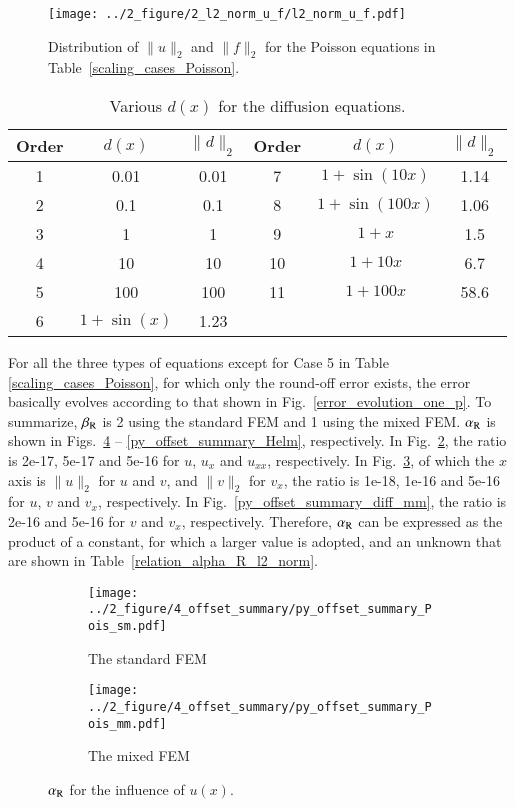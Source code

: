 \documentclass[review,3p]{elsarticle}
\begin{document}
\begin{figure}[!ht]
\centering
    \texttt{[image: ../2\_figure/2\_l2\_norm\_u\_f/l2\_norm\_u\_f.pdf]}
    \caption{Distribution of $\|u\|_2$ and $\|f\|_2$ for the Poisson equations in Table~\ref{scaling_cases_Poisson}.}
    \label{l2_norm_u_f}
\end{figure}


\begin{table}[!ht]
\centering
\caption [w]{Various $d(x)$ for the diffusion equations.} 
\label{d_diffusion_equations}
 \begin{tabular}{c c c c c c} \hline
Order &$d(x)$ & $\|d\|_2$ & Order &$d(x)$ & $\|d\|_2$ \\ \hline
1 & 0.01 & 0.01 & 7 & $1+\sin(10x)$ & 1.14 \\ \hline
2 & 0.1 & 0.1 & 8 & $1+\sin(100x)$ & 1.06 \\ \hline
3 & 1 & 1 & 9 & $1+x$ & 1.5 \\ \hline
4 & 10 & 10 & 10 & $1+10x$ & 6.7 \\ \hline
5 & 100 & 100 & 11& $1+100x$ & 58.6 \\ \hline
6 & $1+\sin(x)$ & 1.23 & & &  \\ \hline
\end{tabular}
\end{table}

\newpage
For all the three types of equations except for Case 5 in Table \ref{scaling_cases_Poisson}, for which only the round-off error exists, the error basically evolves according to that shown in Fig.~\ref{error_evolution_one_p}. To summarize, $\beta_{\rm R}$ is 2 using the standard FEM and 1 using the mixed FEM. $\alpha_{\rm R}$ is shown in Figs.~\ref{py_offset_summary_Pois} -- \ref{py_offset_summary_Helm}, respectively. In Fig.~\ref{py_offset_summary_Pois_sm}, the ratio is 2e-17, 5e-17 and 5e-16 for $u$, $u_x$ and $u_{xx}$, respectively. In Fig.~\ref{py_offset_summary_Pois_mm}, of which the $x$ axis is $\|u\|_2$ for $u$ and $v$, and $\|v\|_2$ for $v_x$, the ratio is 1e-18, 1e-16 and 5e-16 for $u$, $v$ and $v_x$, respectively. In Fig.~\ref{py_offset_summary_diff_mm}, the ratio is 2e-16 and 5e-16 for $v$ and $v_x$, respectively. Therefore, $\alpha_{\rm R}$ can be expressed as the product of a constant, for which a larger value is adopted, and an unknown that are shown in Table~\ref{relation_alpha_R_l2_norm}.

\begin{figure}[!ht]
	\centering
    \begin{subfigure}{6.0cm}
        \texttt{[image: ../2\_figure/4\_offset\_summary/py\_offset\_summary\_Pois\_sm.pdf]}
        \caption{The standard FEM}
        \label{py_offset_summary_Pois_sm}
    \end{subfigure}
    \hspace{-0.2cm}
    \begin{subfigure}{6.0cm}
        \texttt{[image: ../2\_figure/4\_offset\_summary/py\_offset\_summary\_Pois\_mm.pdf]}
        \caption{The mixed FEM}
        \label{py_offset_summary_Pois_mm}
    \end{subfigure}
\caption{$\alpha_{\rm R}$ for the influence of $u(x)$.}
\label{py_offset_summary_Pois}
\end{figure}
\end{document}
